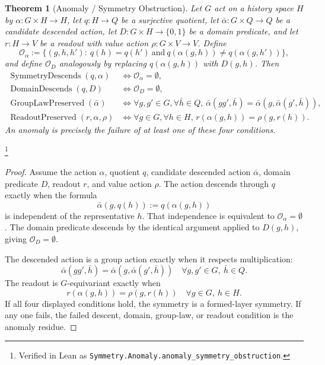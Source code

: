 \documentclass[11pt]{article}
\newtheorem{theorem}{Theorem}[section]
\theoremstyle{definition}
\begin{document}
\begin{theorem}[Anomaly / Symmetry Obstruction]\label{thm:F40}
Let \(G\) act on a history space \(H\) by
\(\alpha:G\times H\to H\), let \(q:H\to Q\) be a surjective quotient,
let \(\bar\alpha:G\times Q\to Q\) be a candidate descended action,
let \(D:G\times H\to\{0,1\}\) be a domain predicate, and let
\(r:H\to V\) be a readout with value action
\(\rho:G\times V\to V\).  Define
\[
  \mathcal O_{\alpha}
  :=
  \{(g,h,h'):\ q(h)=q(h')\ \text{and}\
    q(\alpha(g,h))\ne q(\alpha(g,h'))\},
\]
and define \(\mathcal O_D\) analogously by replacing
\(q(\alpha(g,h))\) with \(D(g,h)\).  Then
\begin{align*}
  \operatorname{SymmetryDescends}(q,\alpha)
  &\iff \mathcal O_{\alpha}=\emptyset,\\
  \operatorname{DomainDescends}(q,D)
  &\iff \mathcal O_D=\emptyset,\\
  \operatorname{GroupLawPreserved}(\bar\alpha)
  &\iff
  \forall g,g'\in G,\forall \bar h\in Q,\,
    \bar\alpha(gg',\bar h)=
    \bar\alpha(g,\bar\alpha(g',\bar h)),\\
  \operatorname{ReadoutPreserved}(r,\alpha,\rho)
  &\iff
  \forall g\in G,\forall h\in H,\,
    r(\alpha(g,h))=\rho(g,r(h)).
\end{align*}
An anomaly is precisely the failure of at least one of these four
conditions.
\end{theorem}
\footnote{Verified in Lean as
\texttt{Symmetry.Anomaly.anomaly\_symmetry\_obstruction}.}
\begin{proof}
Assume the action \(\alpha\), quotient \(q\), candidate descended
action \(\bar\alpha\), domain predicate \(D\), readout \(r\), and
value action \(\rho\).  The action descends through \(q\) exactly when
the formula
\[
  \bar\alpha(g,q(h)):=q(\alpha(g,h))
\]
is independent of the representative \(h\).  That independence is
equivalent to \(\mathcal O_{\alpha}=\emptyset\).  The domain predicate
descends by the identical argument applied to \(D(g,h)\), giving
\(\mathcal O_D=\emptyset\).

The descended action is a group action exactly when it respects
multiplication:
\[
  \bar\alpha(gg',\bar h)
  =
  \bar\alpha(g,\bar\alpha(g',\bar h))
  \quad
  \forall g,g'\in G,\ \bar h\in Q.
\]
The readout is \(G\)-equivariant exactly when
\[
  r(\alpha(g,h))=\rho(g,r(h))
  \quad
  \forall g\in G,\ h\in H.
\]
If all four displayed conditions hold, the symmetry is a formed-layer
symmetry.  If any one fails, the failed descent, domain, group-law, or
readout condition is the anomaly residue.
\end{proof}
\end{document}
